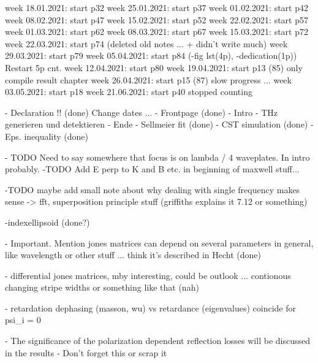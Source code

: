 week 18.01.2021: start p32
week 25.01.2021: start p37
week 01.02.2021: start p42
week 08.02.2021: start p47
week 15.02.2021: start p52
week 22.02.2021: start p57
week 01.03.2021: start p62
week 08.03.2021: start p67
week 15.03.2021: start p72
week 22.03.2021: start p74 (deleted old notes ... + didn't write much)
week 29.03.2021: start p79
week 05.04.2021: start p84 (-fig lst(4p), -dedication(1p)) Restart 5p cnt. 
week 12.04.2021: start p80
week 19.04.2021: start p13 (85) only compile result chapter
week 26.04.2021: start p15 (87) slow progress ...
week 03.05.2021: start p18
week 21.06.2021: start p40
stopped counting

- Declaration !! (done) Change dates ...
- Frontpage (done)
- Intro
- THz generieren und detektieren
- Ende
- Sellmeier fit (done)
- CST simulation (done)
- Eps. inequality (done)

- TODO Need to say somewhere that focus is on lambda / 4 waveplates. In intro probably.
-TODO Add E perp to K and B etc. in beginning of maxwell stuff...

-TODO maybe add small note about why dealing with single frequency makes sense -> fft, superposition principle stuff (griffiths explains it 7.12 or something)

-indexellipsoid (done?)

- Important. Mention jones matrices can depend on several parameters in general, like wavelength or other stuff ... think it's described in Hecht (done)

- differential jones matrices, mby interesting, could be outlook ... contionous changing stripe widths or something like that (nah)

- retardation dephasing (masson, wu) vs retardance (eigenvalues) coincide for psi_i = 0

- The significance of the polarization dependent reflection losses will be discussed in the results
    - Don't forget this or scrap it
    




